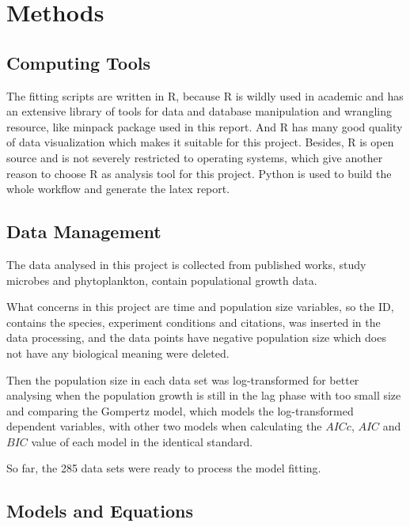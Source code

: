 \documentclass[11pt, a4paper]{article}
\begin{document}
  
\section{Methods}

\subsection{Computing Tools}
The fitting scripts are written in R, because R is wildly used in academic and has an extensive library of tools for data and database manipulation and wrangling resource, like minpack package used in this report. And R has many good quality of data visualization which makes it suitable for this project. Besides, R is open source and is not severely restricted to operating systems, which give another reason to choose R as analysis tool for this project. Python is used to build the whole workflow and generate the latex report.


\subsection{Data Management}
The data analysed in this project is collected from published works\citep{bae2014growth,bernhardt2018metabolic,galarz2016predicting,gill1991growth,phillips1987relation,roth1962continuity,silva2018modelling,sivonen1990effects,stannard1985temperature,zwietering1994modeling}, study microbes and phytoplankton, contain populational growth data. 

What concerns in this project are time and population size variables, so the ID, contains the species, experiment conditions and citations, was inserted in the data processing, and the data points have negative population size which does not have any biological meaning were deleted. 

Then the population size in each data set was log-transformed for better analysing when the population growth is still in the lag phase with too small size and comparing the Gompertz model, which models the log-transformed dependent variables, with other two models when calculating the $AICc$, $AIC$ and $BIC$ value of each model in the identical standard.

So far, the 285 data sets were ready to process the model fitting.


\subsection{Models and Equations}
\end{document}
